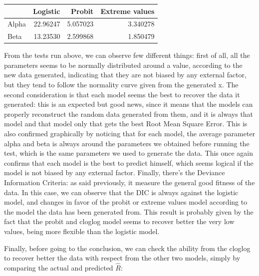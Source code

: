 \documentclass[]{article}
\begin{document}
\begin{table}[!h]
\centering
\begin{tabular}{lrrr}
\toprule
  & Logistic & Probit & Extreme values\\
\midrule
\rowcolor{gray!6}  Alpha & 22.96247 & 5.057023 & 3.340278\\
Beta & 13.23530 & 2.599868 & 1.850479\\
\bottomrule
\end{tabular}
\end{table}

From the tests run above, we can observe few different things: first of
all, all the parameters seems to be normally distributed around a value,
according to the new data generated, indicating that they are not biased
by any external factor, but they tend to follow the normality curve
given from the generated x. The second consideration is that each model
seems the best to recover the data it generated: this is an expected but
good news, since it means that the models can properly reconstruct the
random data generated from them, and it is always that model and that
model only that gets the best Root Mean Square Error. This is also
confirmed graphically by noticing that for each model, the average
parameter alpha and beta is always around the parameters we obtained
before running the test, which is the same parameters we used to
generate the data. This once again confirms that each model is the best
to predict himself, which seems logical if the model is not biased by
any external factor. Finally, there's the Deviance Information Criteria:
as said previously, it measure the general good fitness of the data. In
this case, we can observe that the DIC is always against the logistic
model, and changes in favor of the probit or extreme values model
according to the model the data has been generated from. This result is
probably given by the fact that the probit and cloglog model seems to
recover better the very low values, being more flexible than the
logistic model.

Finally, before going to the conclusion, we can check the ability from
the cloglog to recover better the data with respect from the other two
models, simply by comparing the actual and predicted \(\hat{R}\):
\end{document}
